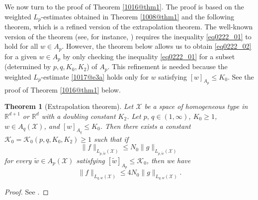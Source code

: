\documentclass[reqno]{amsart}
\numberwithin{equation}{section}
\theoremstyle{plain}
\newtheorem{theorem}{Theorem}[section]
\theoremstyle{definition}
\theoremstyle{remark}
\begin{document}
We now turn to the proof of Theorem \ref{1016@thm1}.
The proof is based on the weighted $L_p$-estimates obtained in Theorem \ref{1008@thm1} and the following theorem, which is  a refined version of the extrapolation theorem. 
The well-known version of the theorem (see, for instance, \cite{MR2797562}) requires the inequality \eqref{eq0222_01} to hold for all $w \in A_p$.
However, the theorem below allows us to obtain \eqref{eq0222_02} for a given $w \in A_p$ by only checking the inequality \eqref{eq0222_01} for a subset (determined by $p,q,K_0, K_2$) of $A_p$.
This refinement is needed because the weighted $L_p$-estimate \eqref{1017@e3a} holds only for $w$ satisfying $[w]_{A_p}\le K_0$.
See the proof of Theorem \ref{1016@thm1} below.

\begin{theorem}[Extrapolation theorem]		\label{1017@@thm1}
Let  ${\mathcal{X}}$ be a space of homogeneous type in ${\mathbb{R}}^{d+1}$ or ${\mathbb{R}}^d$ with a doubling
constant $K_2$.
Let $p,\, q\in (1,\infty)$, $K_0 \ge 1$, $w\in A_q({\mathcal{X}})$, and $[w]_{A_q}\le K_0$.
Then there exists a constant ${\mathcal{K}}_0={\mathcal{K}}_0(p,q,K_0,K_2)\ge 1$ such that if
\begin{equation}
							\label{eq0222_01}
\|f\|_{L_{p,\tilde{w}}({\mathcal{X}})}\le N_0\|g\|_{L_{p,\tilde{w}}({\mathcal{X}})}
\end{equation}
for every $\tilde{w}\in A_p({\mathcal{X}})$ satisfying $[\tilde{w}]_{A_p}\le {\mathcal{K}}_0$, then we have 
\begin{equation}
							\label{eq0222_02}
\|f\|_{L_{q,w}({\mathcal{X}})}\le 4N_0\|g\|_{L_{q,w}({\mathcal{X}})}.
\end{equation}
\end{theorem}

\begin{proof}
See \cite[Theorem 2.6]{arXiv:1603.07844v1}.
\end{proof}
\end{document}
